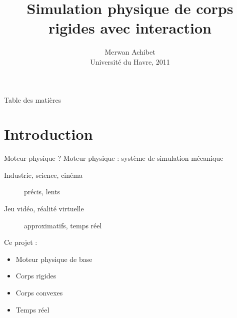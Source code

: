 \documentclass{beamer}
\title{Simulation physique de corps rigides avec interaction}
\author{Merwan Achibet\\ Université du Havre, 2011}
\date{}
\begin{document}
\shorthandoff{!} %


\begin{frame}
  \thispagestyle{empty}
  \maketitle
\end{frame}

\begin{frame}{Table des matières}
  \thispagestyle{empty}
  \tableofcontents
\end{frame}

\setcounter{framenumber}{0}

\section{Introduction}

\begin{frame}{Moteur physique ?}
  Moteur physique : système de simulation mécanique
  \begin{description}
  \item[Industrie, science, cinéma] précis, lents
  \item[Jeu vidéo, réalité virtuelle] approximatifs, temps réel
  \end{description}

  \vfill
  
  Ce projet :
  \begin{itemize}
  \item Moteur physique de base 
  \item Corps rigides
  \item Corps convexes
  \item Temps réel
  \end{itemize}
\end{frame}
\end{document}
